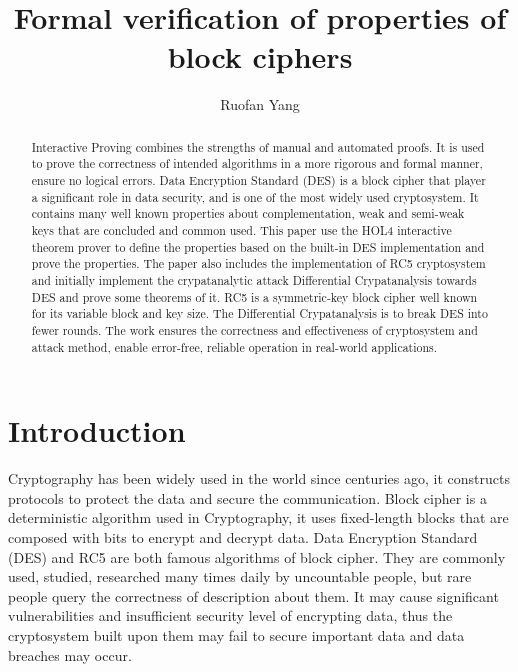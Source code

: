 \documentclass{article}
\title{Formal verification of properties of block ciphers }
\author{Ruofan Yang}
\begin{document}
\maketitle
\begin{abstract}
   Interactive Proving combines the strengths of manual and automated proofs. It is used to prove the correctness of
   intended algorithms in a more rigorous and formal manner,
   ensure no logical errors. Data
   Encryption Standard (DES) is a block cipher that player a
   significant role in data security, and is one of the most
   widely used cryptosystem. It contains many well known properties about complementation, weak and semi-weak keys
   that are concluded and common used. This paper use the HOL4
   interactive theorem prover to define the properties based
   on the built-in DES implementation and prove the properties.
   The paper also includes the implementation of RC5 cryptosystem and initially implement the crypatanalytic attack
   Differential Crypatanalysis towards DES and prove some theorems
   of it. RC5 is a symmetric-key block cipher well known for
   its variable block and key size. The Differential Crypatanalysis is to break DES into fewer rounds. The work ensures
   the correctness and effectiveness of cryptosystem and attack
   method, enable error-free, reliable operation in real-world
   applications.
\end{abstract}

\section{Introduction}
Cryptography has been widely used in the world since centuries ago, it constructs protocols to protect the
data and secure the communication. Block cipher is a deterministic algorithm used in Cryptography, it uses
fixed-length blocks that are composed with bits to encrypt and decrypt data. Data Encryption Standard (DES)
and RC5 are both famous algorithms of block cipher. They are commonly used, studied, researched many times
daily by uncountable people, but rare people query the correctness of description about them. It may cause
significant vulnerabilities and insufficient security level of encrypting data, thus the cryptosystem built
upon them may fail to secure important data and data breaches may occur.
\end{document}

